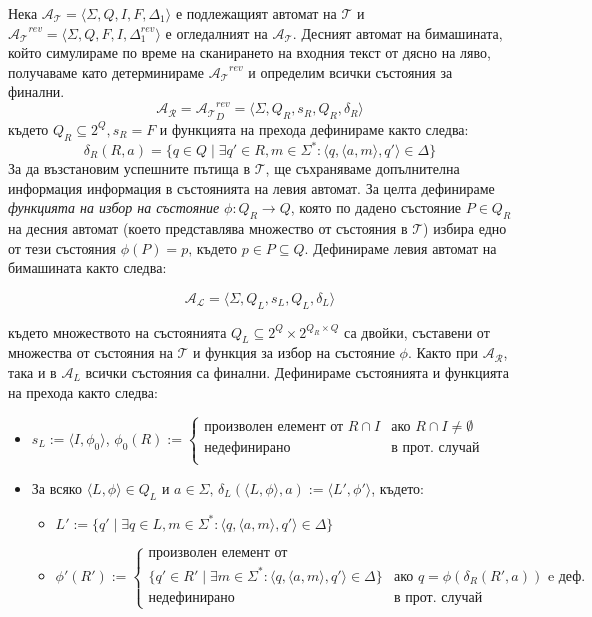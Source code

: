 \documentclass[12pt, oneside]{article}
\theoremstyle{definition}
\begin{document}
Нека \( \mathcal{A_T} = \langle \Sigma, Q, I, F, \Delta_1 \rangle \) е подлежащият автомат на \( \mathcal{T} \) и \( \mathcal{A_T}^{rev} = \langle \Sigma, Q, F, I, \Delta_1^{rev} \rangle \) е огледалният на \( \mathcal{A_T} \). Десният автомат на бимашината, който симулираме по време на сканирането на входния текст от дясно на ляво, получаваме като детерминираме \( \mathcal{A_T}^{rev} \) и определим всички състояния за финални.
\[ \mathcal{A_R} = \mathcal{A_T}^{rev}_D = \langle \Sigma, Q_R, s_R, Q_R, \delta_R \rangle \]
където \( Q_R \subseteq 2^Q, s_R = F \) и функцията на прехода дефинираме както следва:
\[ \delta_R(R,a) = \{ q \in Q \mid \exists q' \in R, m \in \Sigma^* : \langle q, \langle a, m \rangle, q' \rangle \in \Delta \} \]
За да възстановим успешните пътища в \(\mathcal{T}\), ще съхраняваме допълнителна информация информация в състоянията на левия автомат. За целта дефинираме \emph{функцията на избор на състояние} \( \phi:Q_R \to Q \), която по дадено състояние \(P \in Q_R \) на десния автомат (което представлява множество от състояния в \(\mathcal{T}\)) избира едно от тези състояния \( \phi(P) = p \text{, където } p \in P \subseteq Q \). Дефинираме левия автомат на бимашината както следва:

\[ \mathcal{A_L} = \langle \Sigma, Q_L, s_L, Q_L, \delta_L \rangle \]

където множеството на състоянията \( Q_L \subseteq 2^Q \times 2^{Q_R \times Q} \) са двойки, съставени от множества от състояния на \(\mathcal{T}\) и функция за избор на състояние \(\phi\). Както при \(\mathcal{A_R}\), така и в \(\mathcal{A}_L\) всички състояния са финални. Дефинираме състоянията и функцията на прехода както следва:

\begin{itemize}
	\item \( s_L := \langle I, \phi_0 \rangle \), \( \phi_0(R) :=  
	\begin{cases} 
		\text{произволен елемент от } R \cap I & \text{ако } R \cap I \neq \emptyset \\
		\text{недефинирано} & \text{в прот. случай} \\
	\end{cases} \)
	\item За всяко \( \langle L, \phi \rangle \in Q_L \text{ и } a \in \Sigma \text{, } \delta_L(\langle L, \phi \rangle, a) := \langle L', \phi' \rangle \), където:
	\begin{itemize}
		\item \( L' := \{ q' \mid \exists q \in L, m \in \Sigma^* : \langle q, \langle a, m \rangle, q' \rangle \in \Delta \} \)
		\item \( \phi'(R') := 
		\begin{cases}
			\text{произволен елемент от } \\
			\{ q' \in R' \mid \exists m \in \Sigma^* : \langle q, \langle a, m \rangle, q' \rangle \in \Delta \} & \text{ако } q = \phi(\delta_R(R', a)) \text{ e деф.} \\
			\text{недефинирано} & \text{в прот. случай}
		\end{cases} \)
	\end{itemize}
\end{itemize}
\end{document}
